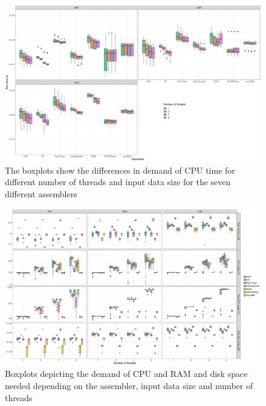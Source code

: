 \documentclass{bmcart}
\begin{document}
\begin{backmatter}
\begin{figure}[h!]
  \includegraphics[width=\textwidth]{plots/comp_time_log.pdf}
  \caption{
  The boxplots show the differences in demand of CPU time for different number of threads and input data size for the seven different assemblers
  }
        \label{fig:performance_runtime}
      \end{figure}

\begin{figure}[h!]
  \includegraphics[width=\textwidth]{plots/usage_amount_threads.pdf}
  \caption{
      Boxplots depicting the demand of CPU and RAM and disk space needed depending on the assembler, input data size and number of threads}
      \label{fig:performance_memory_cpu}
      \end{figure}


\end{backmatter}
\end{document}
